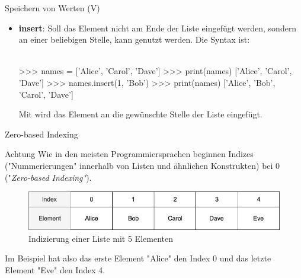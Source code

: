         
         \begin{frame}[fragile]{Speichern von Werten (V)}
            \begin{itemize}
                \item \textbf{insert}: Soll das Element nicht am Ende der Liste eingefügt werden, sondern an einer beliebigen Stelle, kann  genutzt werden. Die Syntax ist: \\~\
                
                
\begin{pyconcode}
>>> names = ['Alice', 'Carol', 'Dave']
>>> print(names)
['Alice', 'Carol', 'Dave']
>>> names.insert(1, 'Bob')
>>> print(names)
['Alice', 'Bob', 'Carol', 'Dave']
\end{pyconcode} 

        Mit  wird das Element an die gewünschte Stelle der Liste eingefügt.
            \end{itemize}
        \end{frame}
        
        \begin{frame}[fragile]{Zero-based Indexing}
            \begin{alertblock}{Achtung}
               Wie in den meisten Programmiersprachen beginnen Indizes ("Nummerierungen" innerhalb von Listen und ähnlichen Konstrukten) bei 0 ("\textit{Zero-based Indexing"}).
               
               \begin{figure}
                   \centering
                   \includegraphics[width=\linewidth, keepratio]{chapters/07_python2_basics/figures/0-based-indexing.png}
                   \caption{Indizierung einer Liste mit 5 Elementen}
               \end{figure}
               
               Im Beispiel hat also das erste Element "Alice" den Index 0 und das letzte Element "Eve" den Index 4.
            \end{alertblock}
        \end{frame}
        
